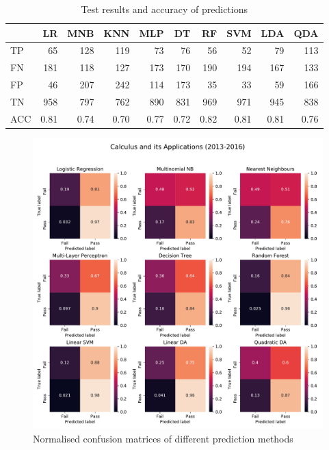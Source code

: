 \documentclass[a4paper]{report}
\begin{document}
\begin{table}[H]
  \centering
  \begin{tabular}{lrrrrrrrrr}
    \toprule
    {} &   LR &  MNB &  KNN &  MLP &   DT &   RF &  SVM &  LDA &  QDA \\
    \midrule
    TP  &   65 &  128 &  119 &   73 &   76 &   56 &   52 &   79 &  113 \\
    FN  &  181 &  118 &  127 &  173 &  170 &  190 &  194 &  167 &  133 \\
    FP  &   46 &  207 &  242 &  114 &  173 &   35 &   33 &   59 &  166 \\
    TN  &  958 &  797 &  762 &  890 &  831 &  969 &  971 &  945 &  838 \\
    ACC & 0.81 & 0.74 & 0.70 & 0.77 & 0.72 & 0.82 & 0.81 & 0.81 & 0.76 \\
    \bottomrule
  \end{tabular}
  \caption{\label{tab:ML_ILA_bin_pre17}Test results and accuracy of predictions}
\end{table}

\begin{figure}[H]
  \centering
  \includegraphics[width=\linewidth]{fig/ML_CAP_bin_pre17.pdf}
  \caption{\label{fig:ML_CAP_bin_pre17}Normalised confusion matrices of different prediction methods}
\end{figure}
\end{document}
